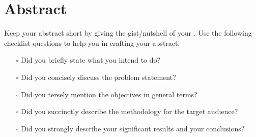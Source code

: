 \chapter*{Abstract}

Keep your abstract short by giving the gist/nutshell of your \MakeTextLowercase{\documentType}.	 Use the following checklist questions to help you in crafting your abstract.	

\begin{itemize}
	\item[$\square$] Did you briefly state what you intend to do?  
	\item[$\square$] Did you concisely discuss the problem statement?
	\item[$\square$] Did you tersely mention the objectives in general terms? 
	\item[$\square$] Did you succinctly describe the methodology for the target audience?
	\item[$\square$] Did you strongly describe your significant results and your conclusions?
\end{itemize}

